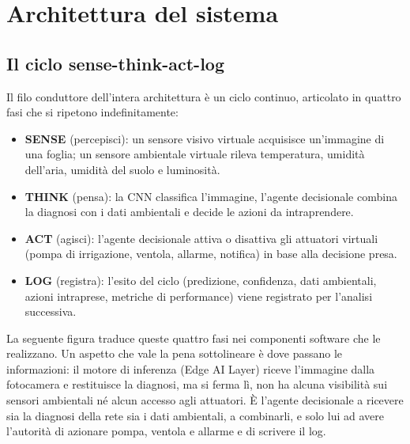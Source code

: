 \section{Architettura del sistema}
\label{sec:architettura}

\subsection{Il ciclo sense-think-act-log}

Il filo conduttore dell'intera architettura è un ciclo continuo, articolato
in quattro fasi che si ripetono indefinitamente:

\begin{itemize}
    \item \textbf{SENSE} (percepisci): un sensore visivo virtuale acquisisce
    un'immagine di una foglia; un sensore ambientale virtuale rileva
    temperatura, umidità dell'aria, umidità del suolo e luminosità.
    \item \textbf{THINK} (pensa): la CNN classifica l'immagine, l'agente
    decisionale combina la diagnosi con i dati ambientali e decide le azioni
    da intraprendere.
    \item \textbf{ACT} (agisci): l'agente decisionale attiva o disattiva gli
    attuatori virtuali (pompa di irrigazione, ventola, allarme, notifica) in
    base alla decisione presa.
    \item \textbf{LOG} (registra): l'esito del ciclo (predizione, confidenza,
    dati ambientali, azioni intraprese, metriche di performance) viene
    registrato per l'analisi successiva.
\end{itemize}

La seguente figura traduce queste quattro fasi nei
componenti software che le realizzano. Un aspetto che vale la pena
sottolineare è dove passano le informazioni: il motore di inferenza (Edge
AI Layer) riceve l'immagine dalla fotocamera e restituisce la diagnosi, ma
si ferma lì, non ha alcuna visibilità sui sensori ambientali né alcun
accesso agli attuatori. È l'agente decisionale a ricevere sia la diagnosi
della rete sia i dati ambientali, a combinarli, e solo lui ad avere
l'autorità di azionare pompa, ventola e allarme e di scrivere il log. 

